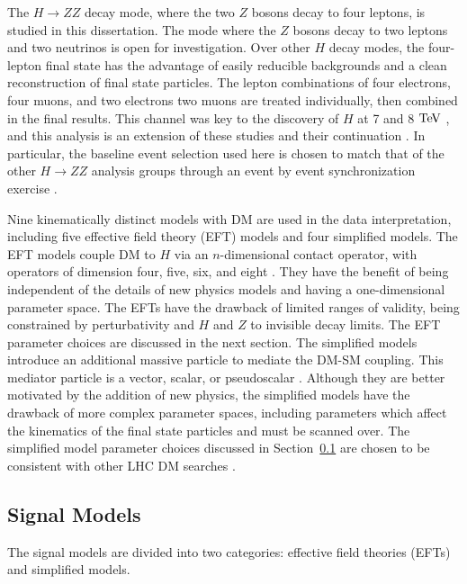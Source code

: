 The $H\rightarrow ZZ$ decay mode, where the two $Z$ bosons decay to four leptons, is studied in this dissertation. The mode where the $Z$ bosons decay to two leptons and two neutrinos is open for investigation. Over other $H$ decay modes, the four-lepton final state has the advantage of easily reducible backgrounds and a clean reconstruction of final state particles. The lepton combinations of four electrons, four muons, and two electrons two muons are treated individually, then combined in the final results. This channel was key to the discovery of $H$ at 7 and 8 $\mathrm{Te\kern -0.1em V}$ \cite{Chatrchyan:2013mxa, ATLAS:2013nma}, and this analysis is an extension of these studies and their continuation \cite{CMS-AN-15-277, CMS-PAS-HIG-15-004}. In particular, the baseline event selection used here is chosen to match that of the other $H\rightarrow ZZ$ analysis groups through an event by event synchronization exercise \cite{synchtwiki}.

Nine kinematically distinct models with DM are used in the data interpretation, including five effective field theory (EFT) models and four simplified models. The EFT models couple DM to $H$ via an $n$-dimensional contact operator, with operators of dimension four, five, six, and eight \cite{Carpenter:2013xra}. They have the benefit of being independent of the details of new physics models and having a one-dimensional parameter space. The EFTs have the drawback of limited ranges of validity, being constrained by perturbativity and $H$ and $Z$ to invisible decay limits. The EFT parameter choices are discussed in the next section. The simplified models introduce an additional massive particle to mediate the DM-SM coupling. This mediator particle is a vector, scalar, or pseudoscalar \cite{Carpenter:2013xra, Berlin:2014cfa}. Although they are better motivated by the addition of new physics, the simplified models have the drawback of more complex parameter spaces, including parameters which affect the kinematics of the final state particles and must be scanned over. The simplified model parameter choices discussed in Section~\ref{sec:sigmodels} are chosen to be consistent with other LHC DM searches \cite{Abercrombie:2015wmb}.

\subsection{Signal Models}
\label{sec:sigmodels}
The signal models are divided into two categories: effective field theories (EFTs) and simplified models.

